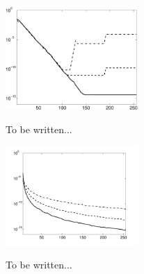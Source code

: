 \documentclass[11pt,a4paper,twoside,bibtotoc]{scrartcl}
\theoremstyle{plain}
\theoremstyle{definition}
\theoremstyle{remark}
\numberwithin{equation}{section}
\numberwithin{table}{section}
\numberwithin{figure}{section}
\begin{document}
\begin{figure}[tb]
  \centering
  {\includegraphics[width=0.45\textwidth]{images/threshold_test}}\hfill
  \caption{To be written...}
  \label{Figure:PoissonTest}
\end{figure}

\begin{figure}[tb]
  \centering
  {\includegraphics[width=0.45\textwidth]{images/locsupp_lambda_test}}\hfill
  \caption{To be written...}
  \label{Figure:PoissonTest}
\end{figure}
\end{document}

